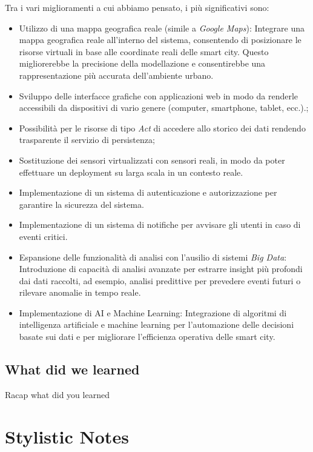 \documentclass{scrartcl}
\begin{document}
Tra i vari miglioramenti a cui abbiamo pensato, i più significativi sono:
\begin{itemize}
    \item Utilizzo di una mappa geografica reale (simile a \textit{Google Maps}): Integrare una mappa geografica reale all'interno del sistema, consentendo di posizionare le risorse virtuali in base alle coordinate reali delle smart city. Questo migliorerebbe la precisione della modellazione e consentirebbe una rappresentazione più accurata dell'ambiente urbano.
    \item Sviluppo delle interfacce grafiche con applicazioni web in modo da renderle accessibili da dispositivi di vario genere (computer, smartphone, tablet, ecc.).;
    \item Possibilità per le risorse di tipo \textit{Act} di accedere allo storico dei dati rendendo trasparente il servizio di persistenza;
    \item Sostituzione dei sensori virtualizzati con sensori reali, in modo da poter effettuare un deployment su larga scala in un contesto reale.
    \item Implementazione di un sistema di autenticazione e autorizzazione per garantire la sicurezza del sistema.
    \item Implementazione di un sistema di notifiche per avvisare gli utenti in caso di eventi critici.
    \item Espansione delle funzionalità di analisi con l'ausilio di sistemi \textit{Big Data}: Introduzione di capacità di analisi avanzate per estrarre insight più profondi dai dati raccolti, ad esempio, analisi predittive per prevedere eventi futuri o rilevare anomalie in tempo reale.
    \item Implementazione di AI e Machine Learning: Integrazione di algoritmi di intelligenza artificiale e machine learning per l'automazione delle decisioni basate sui dati e per migliorare l'efficienza operativa delle smart city.
\end{itemize}

\subsection{What did we learned}

Racap what did you learned

\section*{Stylistic Notes}
\end{document}
